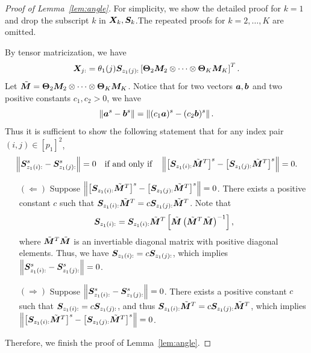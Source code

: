 \documentclass[lettersize,journal]{IEEEtran}
\theoremstyle{definition}
\theoremstyle{definition}
\newcommand{\of}[1]{\left(#1\right)}
\newcommand{\off}[1]{\left[#1\right]}
\begin{document}
\begin{proof}[Proof of Lemma~\ref{lem:angle}] For simplicity, we show the detailed proof for $k = 1$ and drop the subscript $k$ in $\bm X_k, \bm S_k$.The repeated proofs for $k = 2, \ldots, K$ are omitted. 

By tensor matricization, we have
\begin{equation}
    \mX_{j:} = \theta_1(j) \mS_{z_1(j):} \off{\mTheta_2 \mM_2 \otimes \cdots \otimes \mTheta_K \mM_K}^T.
\end{equation}     
Let $\tilde {\bm M} = \boldsymbol{\Theta}_2 \bm M_2 \otimes \cdots \otimes \boldsymbol{\Theta}_K \bm M_K$. Notice that for two vectors $\bm{a}, \bm{b}$ and two positive constants $c_1, c_2 >0$, we have
\begin{equation}
\left\lVert\bm{a}^s - \bm{b}^s\right\rVert = \left\lVert(c_1 \bm{a})^s - (c_2\bm{b})^s\right\rVert.
\end{equation}
Thus it is sufficient to show the following statement that for any index pair $(i,j)\in[p_1]^2$,
\begin{equation}
\onorm{ \mS_{z_1(i):}^s - \mS_{z_1(j):}^s} = 0 \quad \text{if and only if} \quad \onorm{ \off{\mS_{z_1(i):} \tilde \mM^T }^s - \off{\mS_{z_1(j):}\tilde \mM^T}^s} = 0.
\end{equation}
\begin{enumerate}
    \item[$(\Leftarrow)$] Suppose $\onorm{ \off{\mS_{z_1(i):} \tilde \mM^T }^s - \off{\mS_{z_1(j):}\tilde \mM^T}^s} = 0$. There exists a positive constant $c$ such that $\bm S_{z_1(i):} \tilde {\bm M}^T= c \bm S_{z_1(j):} \tilde {\bm M}^T$. Note that
\begin{equation}
    \mS_{z_1(i):} = \mS_{z_1(i):} \tilde \mM^T \off{ \tilde \mM \of{ \tilde \mM^T  \tilde \mM}^{-1}},
\end{equation}
where $ \tilde {\bm M}^T  \tilde {\bm M}$ is an invertiable diagonal matrix with positive diagonal elements. Thus, we have $ \bm S_{z_1(i):} = c  \bm S_{z_1(j):}$, which implies $ \left\lVert  \bm S_{z_1(i):}^s -  \bm S_{z_1(j):}^s \right\rVert = 0 $.

\item[$(\Rightarrow)$] Suppose $ \left\lVert \bm S_{z_1(i):}^s - \bm S_{z_1(j):}^s \right\rVert = 0 $. There exists a positive constant $c$ such that $\bm S_{z_1(i):} = c \bm S_{z_1(j):}$, and thus $\bm S_{z_1(i):} \tilde {\bm M}^T = c \bm S_{z_1(j):} \tilde {\bm M}^T$, which implies $\left\lVert\left[\bm S_{z_1(i):} \tilde {\bm M}^T\right]^s- \left[\bm S_{z_1(j):} \tilde {\bm M}^T\right]^s\right\rVert=0$.
\end{enumerate}
Therefore, we finish the proof of Lemma~\ref{lem:angle}.
\end{proof}
\end{document}
